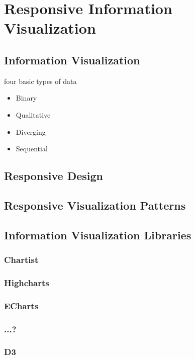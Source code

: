 \chapter{Responsive Information Visualization}

\label{chap:ResponsiveInfoVis}


\section{Information Visualization}

four basic types of data
\begin{itemize}
    \item Binary
    \item Qualitative
    \item Diverging
    \item Sequential
\end{itemize}

\section{Responsive Design}


\section{Responsive Visualization Patterns}


\section{Information Visualization Libraries}

\subsection{Chartist}
\subsection{Highcharts}
\subsection{ECharts}
\subsection{...?}
\subsection{D3}
